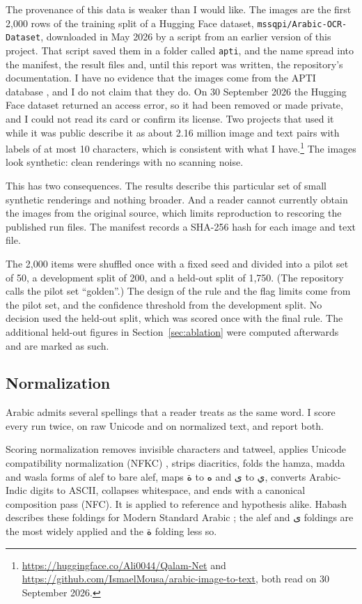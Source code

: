 \documentclass[11pt,a4paper]{article}
\newcommand{\ar}[1]{{\beginR\arabicfont #1\endR}}
\begin{document}
The provenance of this data is weaker than I would like. The images are the
first 2,000 rows of the training split of a Hugging Face dataset,
\texttt{mssqpi/Arabic-OCR-Dataset}, downloaded in May 2026 by a script from an
earlier version of this project. That script saved them in a folder called
\texttt{apti}, and the name spread into the manifest, the result files and,
until this report was written, the repository's documentation. I have no
evidence that the images come from the APTI database \cite{apti}, and I do not
claim that they do. On 30 September 2026 the Hugging Face dataset returned an
access error, so it had been removed or made private, and I could not read its
card or confirm its license. Two projects that used it while it was public
describe it as about 2.16 million image and text pairs with labels of at most
10 characters, which is consistent with what I
have.\footnote{\url{https://huggingface.co/Ali0044/Qalam-Net} and
\url{https://github.com/IsmaelMousa/arabic-image-to-text}, both read on 30
September 2026.} The images look synthetic: clean renderings with no scanning
noise.

This has two consequences. The results describe this particular set of small
synthetic renderings and nothing broader. And a reader cannot currently obtain
the images from the original source, which limits reproduction to rescoring
the published run files. The manifest records a SHA-256 hash for each image
and text file.

The 2,000 items were shuffled once with a fixed seed and divided into a pilot
set of 50, a development split of 200, and a held-out split of 1,750. (The
repository calls the pilot set ``golden''.) The design of the rule and the flag
limits come from the pilot set, and the confidence threshold from the
development split. No decision used the held-out split, which was scored once
with the final rule. The additional held-out figures in
Section~\ref{sec:ablation} were computed afterwards and are marked as such.

\subsection{Normalization}

Arabic admits several spellings that a reader treats as the same word. I
score every run twice, on raw Unicode and on normalized text, and report both.

Scoring normalization removes invisible characters and tatweel, applies
Unicode compatibility normalization (NFKC) \cite{uax15}, strips diacritics,
folds the hamza, madda and wasla forms of alef to bare alef, maps \ar{ة} to
\ar{ه} and \ar{ى} to \ar{ي}, converts Arabic-Indic digits to ASCII, collapses
whitespace, and ends with a canonical composition pass (NFC). It is applied
to reference and hypothesis alike. Habash describes these foldings for Modern
Standard Arabic \cite{habash}; the alef and \ar{ى} foldings are the most
widely applied and the \ar{ة} folding less so.
\end{document}
